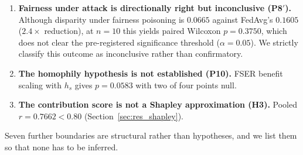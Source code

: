 \documentclass[preprint,12pt]{elsarticle}
\theoremstyle{plain}
\theoremstyle{definition}
\theoremstyle{remark}
\begin{document}
\begin{enumerate}
\item \textbf{Fairness under attack is directionally right but inconclusive (P8$'$).} Although disparity under fairness poisoning is $0.0665$ against FedAvg's $0.1605$ ($2.4\times$ reduction), at $n = 10$ this yields paired Wilcoxon $p = 0.3750$, which does not clear the pre-registered significance threshold ($\alpha = 0.05$). We strictly classify this outcome as inconclusive rather than confirmatory.

\item \textbf{The homophily hypothesis is not established (P10).} FSER benefit scaling with $h_s$ gives $p = 0.0583$ with two of four points null.

\item \textbf{The contribution score is not a Shapley approximation (H3).} Pooled $r = 0.7662 < 0.80$ (Section~\ref{sec:res_shapley}).
\end{enumerate}

\noindent Seven further boundaries are structural rather than hypotheses, and we list them so that none has to be inferred.
\end{document}
